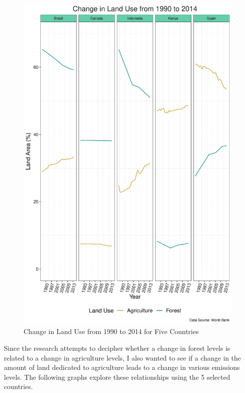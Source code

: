 \documentclass[12pt,]{article}
\begin{document}
\begin{figure}
\centering
\includegraphics{Marx_ENV872_Project_files/figure-latex/unnamed-chunk-4-1.pdf}
\caption{\label{fig:fig3}Change in Land Use from 1990 to 2014 for Five
Countries}
\end{figure}

Since the research attempts to decipher whether a change in forest
levels is related to a change in agriculture levels, I also wanted to
see if a change in the amount of land dedicated to agriculture leads to
a change in various emissions levels. The following graphs explore these
relationships using the 5 selected countries.
\end{document}
